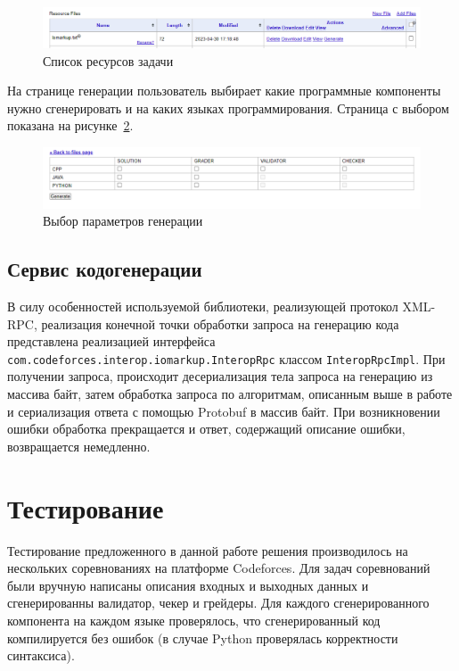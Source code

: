 \documentclass[times,specification,annotation]{style/itmo-student-thesis/itmo-student-thesis}
\begin{document}
\begin{figure}[!h]
\caption{Список ресурсов задачи}\label{resources-screenshot}
\centering
\includegraphics[scale=0.6]{img/files.png}
\end{figure}

На странице генерации пользователь выбирает какие программные компоненты нужно сгенерировать и на каких языках программирования. Страница с выбором показана на рисунке~\ref{generate-screenshot}.

\begin{figure}[!h]
\caption{Выбор параметров генерации}\label{generate-screenshot}
\centering
\includegraphics[scale=0.6]{img/generate.png}
\end{figure}

\subsection{Сервис кодогенерации}

В силу особенностей используемой библиотеки, реализующей протокол XML-RPC, реализация конечной точки обработки запроса на генерацию кода представлена реализацией интерфейса \texttt{com.codeforces.interop.iomarkup.InteropRpc} классом \texttt{InteropRpcImpl}. При получении запроса, происходит десериализация тела запроса на генерацию из массива байт, затем обработка запроса по алгоритмам, описанным выше в работе и сериализация ответа с помощью Protobuf в массив байт. При возникновении ошибки обработка прекращается и ответ, содержащий описание ошибки, возвращается немедленно.

\section{Тестирование}

Тестирование предложенного в данной работе решения производилось на нескольких соревнованиях на платформе Codeforces. Для задач соревнований были вручную написаны описания входных и выходных данных и сгенерированны валидатор, чекер и грейдеры. Для каждого сгенерированного компонента на каждом языке проверялось, что сгенерированный код компилируется без ошибок (в случае Python проверялась корректности синтаксиса).
\end{document}

